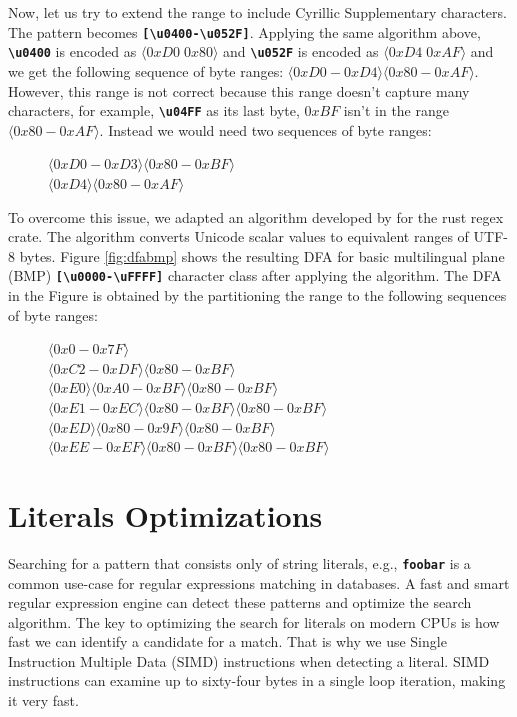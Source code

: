 Now, let us try to extend the range to include Cyrillic Supplementary characters. The pattern becomes \texttt{\textbf{[\textbackslash u0400-\textbackslash u052F]}}. Applying the same algorithm above,  \texttt{\textbf{\textbackslash u0400}} is encoded as $\langle0xD0 \; 0x80\rangle$ and \texttt{\textbf{\textbackslash u052F}} is encoded as $\langle0xD4 \; 0xAF\rangle$ and we get the following sequence of byte ranges: $\langle0xD0-0xD4\rangle \langle0x80-0xAF\rangle$. However, this range is not correct because this range doesn't capture many characters, for example, \texttt{\textbf{\textbackslash u04FF}} as its last byte, $0xBF$ isn't in the range $\langle0x80-0xAF\rangle$. Instead we would need two sequences of byte ranges:

\begin{figure}[H]
\centering
$\langle0xD0-0xD3\rangle \langle0x80-0xBF\rangle$\\
$\langle0xD4\rangle \langle0x80-0xAF\rangle$
\end{figure}


To overcome this issue, we adapted an algorithm developed by \citet{utf8-ranges} for the rust regex crate. The algorithm converts Unicode scalar values to equivalent ranges of UTF-8 bytes. Figure \ref{fig:dfabmp} shows the resulting DFA for basic multilingual plane (BMP) \texttt{\textbf{[\textbackslash u{0000}-\textbackslash u{FFFF}]}} character class after applying the algorithm. The DFA in the Figure is obtained by the partitioning the range to the following sequences of byte ranges:

\begin{figure}[H]
\centering
$\langle0x0-0x7F\rangle$\\
$\langle0xC2-0xDF\rangle \langle0x80-0xBF\rangle$\\
$\langle0xE0\rangle \langle0xA0-0xBF\rangle \langle0x80-0xBF\rangle$\\
$\langle0xE1-0xEC\rangle \langle0x80-0xBF\rangle \langle0x80-0xBF\rangle$\\
$\langle0xED\rangle \langle0x80-0x9F\rangle \langle0x80-0xBF\rangle$\\
$\langle0xEE-0xEF\rangle \langle0x80-0xBF\rangle \langle0x80-0xBF\rangle$
\end{figure}


\section{Literals Optimizations}\label{section:simdopt}
Searching for a pattern that consists only of string literals, e.g., \texttt{\textbf{foobar}} is a common use-case for regular expressions matching in databases. A fast and smart regular expression engine can detect these patterns and optimize the search algorithm. The key to optimizing the search for literals on modern CPUs is how fast we can identify a candidate for a match. That is why we use Single Instruction Multiple Data (SIMD) instructions when detecting a literal. SIMD instructions can examine up to sixty-four bytes in a single loop iteration, making it very fast.

